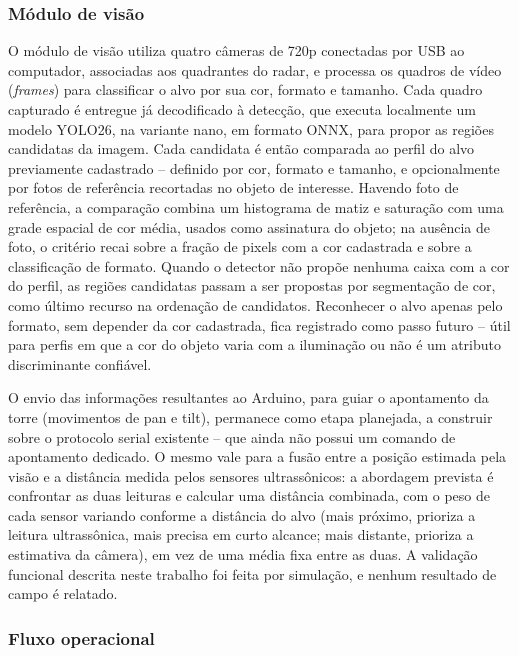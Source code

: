 \documentclass[12pt,a4paper]{article}
\begin{document}
\subsubsection{Módulo de visão}

O módulo de visão utiliza quatro câmeras de 720p conectadas por USB ao computador, associadas aos
quadrantes do radar, e processa os quadros de vídeo (\textit{frames}) para classificar o alvo por
sua cor, formato e tamanho. Cada quadro capturado é entregue já decodificado à detecção, que executa
localmente um modelo YOLO26, na variante nano, em formato ONNX, para propor as regiões candidatas
da imagem. Cada
candidata é então comparada ao perfil do alvo previamente cadastrado -- definido por cor, formato e
tamanho, e opcionalmente por fotos de referência recortadas no objeto de interesse. Havendo foto de
referência, a comparação combina um histograma de matiz e saturação com uma grade espacial de cor
média, usados como assinatura do objeto; na ausência de foto, o critério recai sobre a fração de
pixels com a cor cadastrada e sobre a classificação de formato. Quando o detector não propõe nenhuma
caixa com a cor do perfil, as regiões candidatas passam a ser propostas por segmentação de cor, como
último recurso na ordenação de candidatos. Reconhecer o alvo apenas pelo formato, sem depender da
cor cadastrada, fica registrado como passo futuro -- útil para perfis em que a cor do objeto varia
com a iluminação ou não é um atributo discriminante confiável.

O envio das informações resultantes ao Arduino, para guiar o apontamento da torre (movimentos de
pan e tilt), permanece como etapa planejada, a construir sobre o protocolo serial existente -- que
ainda não possui um comando de apontamento dedicado. O mesmo vale para a fusão entre a posição
estimada pela visão e a distância medida pelos sensores ultrassônicos: a abordagem prevista é
confrontar as duas leituras e calcular uma distância combinada, com o peso de cada sensor variando
conforme a distância do alvo (mais próximo, prioriza a leitura ultrassônica, mais precisa em curto
alcance; mais distante, prioriza a estimativa da câmera), em vez de uma média fixa entre as duas. A
validação funcional descrita neste trabalho foi feita por simulação, e nenhum resultado de campo é
relatado.

\subsubsection{Fluxo operacional}
\end{document}
